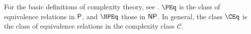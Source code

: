 For the basic definitions of complexity theory, see \autocite{ab09}.
%
%
%
%
%
$\PEq$ is the class of equivalence relations in $\P$, and $\NPEq$ those in $\NP$.
In general, the class $\CEq$ is the class of equivalence relations in the complexity class $\mathcal{C}$.

